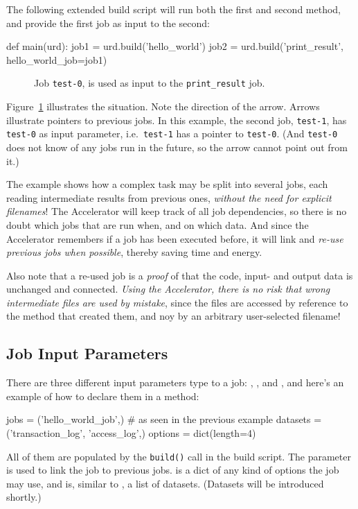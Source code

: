 \clearpage
The following extended build script will run both the first and second
method, and provide the first job as input to the second:
\begin{python}
def main(urd):
    job1 = urd.build('hello_world')
    job2 = urd.build('print_result', hello_world_job=job1)
\end{python}

\begin{figure}[t]
    \hspace{1.5cm}
    \caption{Job \texttt{test-0}, is used as input to the
      \texttt{print\_result} job.}
    \label{fig:execflow-print-result}
\end{figure}

Figure~\ref{fig:execflow-print-result} illustrates the situation.
Note the direction of the arrow.  Arrows illustrate pointers to
previous jobs.  In this example, the second job, \texttt{test-1}, has
\texttt{test-0} as input parameter, i.e.\ \texttt{test-1} has a
pointer to \texttt{test-0}.  (And \texttt{test-0} does not know of any
jobs run in the future, so the arrow cannot point out from it.)

The example shows how a complex task may be split into several jobs,
each reading intermediate results from previous ones, \emph{without
the need for explicit filenames}!  The Accelerator will keep track of
all job dependencies, so there is no doubt which jobs that are run
when, and on which data.  And since the Accelerator remembers if a job
has been executed before, it will link and \emph{re-use previous jobs
when possible}, thereby saving time and energy.

Also note that a re-used job is a \emph{proof} of that the code,
input- and output data is unchanged and connected.  \emph{Using the
Accelerator, there is no risk that wrong intermediate files are used
by mistake}, since the files are accessed by reference to the method
that created them, and noy by an arbitrary user-selected filename!


\subsection{Job Input Parameters}
There are three different input parameters type to a job: \jobs,
\datasets, and \options, and here's an example of how to declare them
in a method:
\begin{python}
jobs = ('hello_world_job',)   # as seen in the previous example
datasets = ('transaction_log', 'access_log',)
options = dict(length=4)
\end{python}
All of them are populated by the \texttt{build()} call in the build
script.  The \jobs parameter is used to link the job to previous jobs.
\options is a dict of any kind of options the job may use, and
\datasets is, similar to \jobs, a list of datasets.  (Datasets will be
introduced shortly.)


